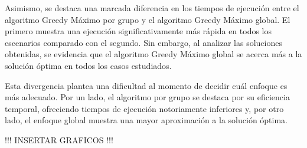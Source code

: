 Asimismo, se destaca una marcada diferencia en los tiempos de ejecución entre el algoritmo Greedy Máximo por grupo y el algoritmo Greedy Máximo global. El primero muestra una ejecución significativamente más rápida en todos los escenarios comparado con el segundo. Sin embargo, al analizar las soluciones obtenidas, se evidencia que el algoritmo Greedy Máximo global se acerca más a la solución óptima en todos los casos estudiados.

Esta divergencia plantea una dificultad al momento de decidir cuál enfoque es más adecuado. Por un lado, el algoritmo por grupo se destaca por su eficiencia temporal, ofreciendo tiempos de ejecución notoriamente inferiores y, por otro lado, el enfoque global muestra una mayor aproximación a la solución óptima.

!!! INSERTAR GRAFICOS !!!


